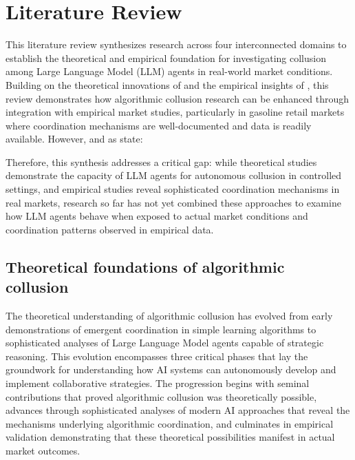 \section{Literature Review}


This literature review synthesizes research across four interconnected domains to establish the theoretical and empirical foundation for investigating collusion among Large Language Model (LLM) agents in real-world market conditions. Building on the theoretical innovations of \textcite{fish_algorithmic_2025} and the empirical insights of \textcite{byrne_learning_2019}, this review demonstrates how algorithmic collusion research can be enhanced through integration with empirical market studies, particularly in gasoline retail markets where coordination mechanisms are well-documented and data is readily available. However, and as \textcite[p.24]{fish_algorithmic_2025} state:
\begin{displayquote}
\end{displayquote}

Therefore, this synthesis addresses a critical gap: while theoretical studies demonstrate the capacity of LLM agents for autonomous collusion in controlled settings, and empirical studies reveal sophisticated coordination mechanisms in real markets, research so far has not yet combined these approaches to examine how LLM agents behave when exposed to actual market conditions and coordination patterns observed in empirical data.


\subsection{Theoretical foundations of algorithmic collusion}

The theoretical understanding of algorithmic collusion has evolved from early demonstrations of emergent coordination in simple learning algorithms to sophisticated analyses of Large Language Model agents capable of strategic reasoning. This evolution encompasses three critical phases that lay the groundwork for understanding how AI systems can autonomously develop and implement collaborative strategies. The progression begins with seminal contributions that proved algorithmic collusion was theoretically possible, advances through sophisticated analyses of modern AI approaches that reveal the mechanisms underlying algorithmic coordination, and culminates in empirical validation demonstrating that these theoretical possibilities manifest in actual market outcomes.

